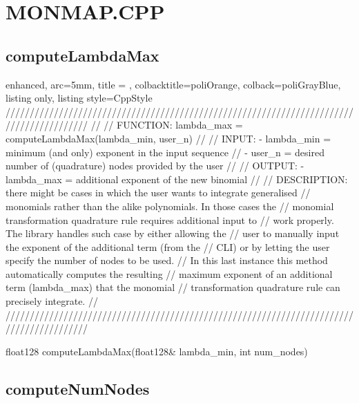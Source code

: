 \documentclass[a4paper, twosided]{book}
\begin{document}
\newpage
\section[MonMap.cpp]{\changefont MONMAP.CPP}\label{Sec4.1}

\subsection[computeLambdaMax]{\changefont computeLambdaMax}\label{SubSec4.1.1}

\begin{tcblisting}{enhanced,
                   arc=5mm,
                   title = \color{black}{\large \ttfamily MonMap.cpp/computeLambdaMax},
                   colbacktitle=poliOrange,
                   colback=poliGrayBlue,
                   listing only,
                   listing style=CppStyle}
/////////////////////////////////////////////////////////////////////////////////////////
//
//       FUNCTION: lambda_max = computeLambdaMax(lambda_min, user_n)
//                
//          INPUT: - lambda_min = minimum (and only) exponent in the input sequence
//                 - user_n = desired number of (quadrature) nodes provided by the user
//
//         OUTPUT: - lambda_max = additional exponent of the new binomial
//
//    DESCRIPTION: there might be cases in which the user wants to integrate generalised 
//                 monomials rather than the alike polynomials. In those cases the 
//                 monomial transformation quadrature rule requires additional input to 
//                 work properly. The library handles such case by either allowing the
//                 user to manually input the exponent of the additional term (from the 
//                 CLI) or by letting the user specify the number of nodes to be used.
//                 In this last instance this method automatically computes the resulting
//                 maximum exponent of an additional term (lambda_max) that the monomial
//                 transformation quadrature rule can precisely integrate.
//
/////////////////////////////////////////////////////////////////////////////////////////

float128 computeLambdaMax(float128& lambda_min, int num_nodes)
\end{tcblisting}

\subsection[computeNumNodes]{\changefont computeNumNodes}\label{SubSec4.1.2}
\end{document}
